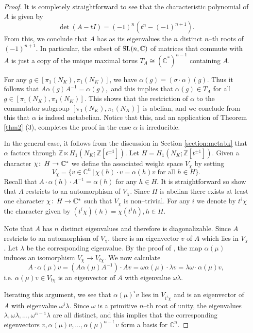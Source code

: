 \documentclass[12pt]{amsart}
\theoremstyle{plain}
\theoremstyle{remark}
\begin{document}
\begin{proof}
It is completely straightforward to see that the characteristic polynomial of
$A$ is given by
$$\det (A-tI) =
(-1)^n(t^n - (-1)^{n+1}).$$
From this, we conclude that $A$ has as its eigenvalues the
$n$ distinct $n$--th roots of $(-1)^{n+1}.$ In particular, the subset of ${{\rm SL}}(n,{{\mathbb C}})$
of matrices that commute with $A$ is just a copy of the unique maximal torus
$T_A \cong ({{\mathbb C}}^*)^{n-1}$ containing $A$.

For any $g \in [\pi_1(N_K), \pi_1(N_K)]$, we have
${\alpha}(g) = ({\sigma} \cdot {\alpha})(g)$. Thus it follows that
$A {\alpha}(g) A^{-1} = {\alpha}(g),$ and this implies that ${\alpha}(g) \in T_A$ for
all $g \in [\pi_1(N_K), \pi_1(N_K)]$. This shows that
the restriction of ${\alpha}$ to the commutator subgroup
$[\pi_1(N_K), \pi_1(N_K)]$ is abelian, and we conclude from this that
${\alpha}$ is indeed metabelian. Notice that this, and an application of  Theorem \ref{thm2} (3),
completes the proof in the case ${\alpha}$ is irreducible.

In the general case, it follows from the discussion in Section  \ref{section:metabk} that
${\alpha}$ factors through ${{\mathbb Z}}\ltimes H_1(N_K;{{\mathbb Z}}[t^{\pm 1}])$.
Let $H =  H_1(N_K;{{\mathbb Z}}[t^{\pm 1}])$.
Given a character $\chi {\colon\thinspace} H\to{{\mathbb C}}^*$ we define the associated weight space $V_\chi$ by setting
$$V_{\chi}=\{ v\in {{\mathbb C}}^n \, |\, \chi(h)\cdot v={\alpha}(h)v \text{ for all }h\in H\}.$$
Recall that  $A\cdot {\alpha}(h)\cdot A^{-1}={\alpha}(h)$ for any $h\in H$. It is straightforward so show that $A$ restricts to an automorphism of $V_\chi$.
Since $H$ is abelian there exists at least one character $\chi{\colon\thinspace} H\to {{\mathbb C}}^*$ such that
$V_{\chi}$ is non--trivial. For any $i$ we denote by $t^i\chi$ the character given by $(t^i\chi)(h)=\chi(t^i h), h\in H$.

Note that $A$ has $n$ distinct eigenvalues and therefore is diagonalizable.
Since $A$ restricts to an automorphism of $V_\chi$, there is an
eigenvector $v$ of $A$ which lies in $V_{\chi}$. Let ${\lambda}$ be the corresponding eigenvalue. By the proof of \cite[Theorem~2.3]{BF08},
the map ${\alpha}(\mu)$ induces an isomorphism $V_{\chi}\to V_{t\chi}$.
We now calculate
\[ A\cdot {\alpha}(\mu)  v=(A{\alpha}(\mu)A^{-1})\cdot Av={\omega} {\alpha}(\mu) \cdot {\lambda} v={\lambda} {\omega} \cdot {\alpha}(\mu)v,\]
i.e.  ${\alpha}(\mu) v \in V_{t\chi}$ is an eigenvector of $A$ with eigenvalue ${\omega} {\lambda}$.

Iterating this argument, we see that ${\alpha}(\mu)^iv$ lies in $V_{t^i\chi}$ and is an eigenvector of $A$ with eigenvalue ${\omega}^i {\lambda}$.
Since ${\omega}$ is a primitive $n$--th root of unity, the eigenvalues ${\lambda},{\omega} {\lambda},\dots,{\omega}^{n-1}{\lambda}$ are all distinct, and this implies that
the corresponding eigenvectors $v, {\alpha}(\mu)v, \dots, {\alpha}(\mu)^{n-1}v$  form a basis for ${{\mathbb C}}^n$.


\end{proof}
\end{document}
